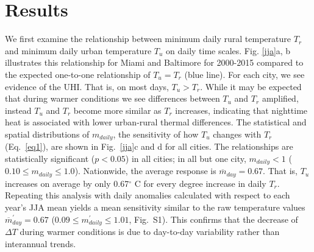 \documentclass[12pt]{iopart}
\begin{document}
{%



\section*{Results}
We first examine the relationship between minimum daily rural temperature $T_{r}$ and minimum daily urban temperature $T_u$ on daily time scales. Fig. \ref{jja}a, b illustrates this relationship for Miami and Baltimore for 2000-2015 compared to the expected one-to-one relationship of $T_u = T_r$ (blue line). For each city, we see evidence of the UHI. That is, on most days, $T_u > T_r$. While it may be expected that during warmer conditions we see differences between $T_u$ and $T_r$ amplified, instead $T_u$ and $T_r$ become more similar as $T_r$ increases, indicating that nighttime heat is associated with lower urban-rural thermal differences. 
The statistical and spatial distributions of $m_{daily}$, the sensitivity of how $T_u$ changes with $T_r$ (Eq.~\ref{eq1}), are shown in  Fig.~\ref{jja}c and d for all cities. The relationships are statistically significant ($p < 0.05$) in all cities; in all but one city, $m_{daily}< 1$ ( $0.10 \leq m_{daily} \leq 1.0 $).   Nationwide, the average response is $\overline{m}_{day} = 0.67$. That is, $T_u$ increases on average by only 0.67$^\circ$ C for every degree increase in daily $T_r$.
Repeating this analysis with daily anomalies calculated with respect to each year's JJA mean yields a mean sensitivity similar to the raw temperature values $\overline{ m}_{day}^\prime  = 0.67 $ ($0.09\leq m_{daily}^\prime \leq 1.01$, Fig.~S1). This confirms that the decrease of $\Delta T$ during warmer conditions is due to day-to-day variability rather than interannual trends.%

}
\end{document}
